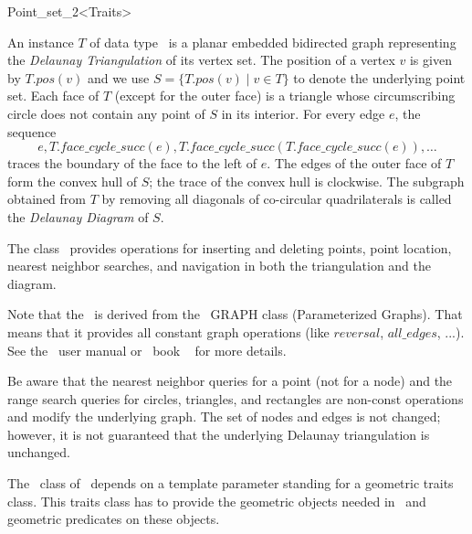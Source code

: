 \begin{ccRefClass}{Point_set_2<Traits>}

\ccDefinition


An instance $T$ of data type \ccRefName\  is a planar embedded bidirected
graph representing the {\em Delaunay Triangulation} of its vertex set.
The position of a vertex $v$ is given by $T.pos(v)$ and we use 
$S = \{ T.pos(v) \mid v \in T \}$ to denote the underlying point set.
Each face of $T$ (except for the outer face) is  a triangle whose 
circumscribing circle does not contain any point of $S$ in its interior.
For every edge $e$, the sequence 
\[e, T.face\_cycle\_succ(e), T.face\_cycle\_succ(T.face\_cycle\_succ(e)),\ldots\]
traces the boundary of the face to the left of $e$.
The edges of the outer face of $T$ form the convex hull of $S$; the trace of 
the convex hull is clockwise.
The subgraph obtained from $T$ by removing all diagonals of
co-circular quadrilaterals  is called the {\em Delaunay Diagram}
of $S$.

The class \ccRefName\ provides operations for inserting and deleting points,
point location, nearest neighbor searches, and navigation in both
the triangulation and the diagram.

Note that the \ccRefName\ is derived from the \leda\ GRAPH class
(Parameterized Graphs). That means that it provides all constant
graph operations (like $reversal$, $all\_edges$, ...).
See the \leda\ user manual or \leda\ book ~\cite{LEDAbook} for more details.

Be aware that the nearest neighbor queries for a point (not for a node) and
the range search queries for circles, triangles, and rectangles are non-const 
operations and modify the underlying graph. The set of nodes and edges is 
not changed; however, it is not guaranteed that the underlying Delaunay 
triangulation is unchanged.

The \ccRefName\ class of \cgal\ depends on a template parameter standing for a
geometric traits class. This traits class has to provide the geometric objects needed
in \ccRefName\ and geometric predicates on these objects.


\ccHtmlLinksOff


\ccTypes
{}
\ccThreeToTwo
{}



\end{ccRefClass}
